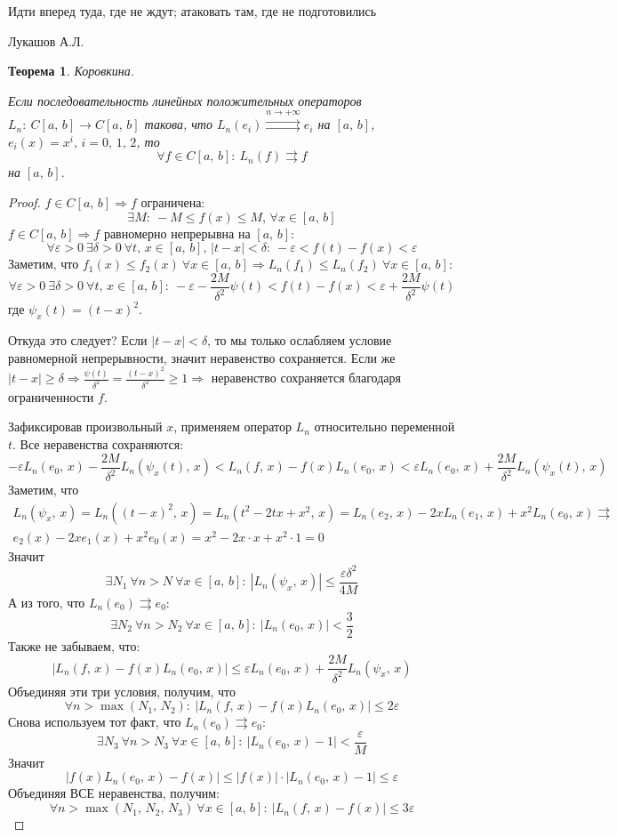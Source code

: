 \documentclass[a4paper,12pt]{article}
\renewcommand{\leq}{\ensuremath{\leqslant}}
\renewcommand{\geq}{\ensuremath{\geqslant}}
\theoremstyle{plain}
\newtheorem{theorem}{Теорема}[section]
\theoremstyle{definition}
\theoremstyle{remark}
\begin{document}
\epigraph{Идти вперед туда, где не ждут; атаковать там, где не подготовились}{Лукашов А.Л.}

\begin{theorem}
	Коровкина.

	Если последовательность линейных положительных операторов $L_n:\: C[a,\,b] \to C[a,\,b]$ такова, что $L_n(e_i) \stackrel{n \to +\infty}{\rightrightarrows} e_i$ на $[a,\,b]$, $e_i(x) = x^i,\, i = 0,\,1,\,2$, то 
	\[\forall f \in C[a,\,b]:\: L_n(f) \rightrightarrows f\]
	на $[a,\,b]$.
\end{theorem}
\begin{proof}
	$f \in C[a,\,b] \Rightarrow f$ ограничена:
	\[\exists M:\: -M \leq f(x) \leq M,\, \forall x \in [a,\,b]\]
	$f \in C[a,\,b] \Rightarrow f$ равномерно непрерывна на $[a,\,b]$: 
	\[\forall \varepsilon > 0 \: \exists \delta > 0 \: \forall t,\, x \in [a,\,b],\, |t - x| < \delta:\: -\varepsilon < f(t) - f(x) < \varepsilon\]
	Заметим, что $f_1(x) \leq f_2(x) \: \forall x \in [a,\,b] \Rightarrow L_n(f_1) \leq L_n(f_2) \: \forall x \in [a,\,b]$:
	\[\forall \varepsilon > 0 \: \exists \delta > 0 \: \forall t,\,x \in [a,\,b]:\: -\varepsilon - \frac{2M}{\delta^2}\psi(t) < f(t) - f(x) < \varepsilon + \frac{2M}{\delta^2}\psi(t)\]
	где $\psi_x(t) = (t - x)^2$.

	Откуда это следует? Если $|t - x| < \delta$, то мы только ослабляем условие равномерной непрерывности, значит неравенство сохраняется. Если же $|t - x| \geq \delta \Rightarrow \frac{\psi(t)}{\delta^2} = \frac{(t - x)^2}{\delta^2} \geq 1 \Rightarrow$ неравенство сохраняется благодаря ограниченности $f$.

	Зафиксировав произвольный $x$, применяем оператор $L_n$ относительно переменной $t$. Все неравенства сохраняются:
	\[-\varepsilon L_n(e_0,\, x) - \frac{2M}{\delta^2}L_n(\psi_x(t),\,x) < L_n(f,\,x) - f(x)L_n(e_0,\,x) < \varepsilon L_n(e_0,\, x) + \frac{2M}{\delta^2}L_n(\psi_x(t),\,x)\]
	Заметим, что 
	\begin{align*}
		L_n(\psi_x,\,x) = L_n((t - x)^2,\,x) = L_n(t^2 - 2tx + x^2,\,x) = L_n(e_2,\,x) - 2xL_n(e_1,\,x) + x^2L_n(e_0,\,x) \rightrightarrows\\
		e_2(x) - 2xe_1(x) + x^2e_0(x) = x^2 - 2x\cdot x + x^2\cdot 1 = 0
	\end{align*}
	Значит 
	\[\exists N_1 \: \forall n > N \: \forall x \in [a,\,b]:\: |L_n(\psi_x,\,x)| \leq \frac{\varepsilon\delta^2}{4M}\]
	А из того, что $L_n(e_0) \rightrightarrows e_0$:
	\[\exists N_2 \: \forall n > N_2 \: \forall x \in [a,\,b] :\: |L_n(e_0,\,x)| < \frac{3}{2}\]
	Также не забываем, что:
	\[|L_n(f,\,x) - f(x)L_n(e_0,\,x)| \leq \varepsilon L_n(e_0,\,x) + \frac{2M}{\delta^2}L_n(\psi_x,\,x)\]
	Объединяя эти три условия, получим, что
	\[\forall n > \max(N_1,\,N_2):\: |L_n(f,\,x) - f(x)L_n(e_0,\,x)| \leq 2\varepsilon\]
	Снова используем тот факт, что $L_n(e_0) \rightrightarrows e_0$:
	\[\exists N_3 \: \forall n > N_3 \: \forall x \in [a,\,b]:\: |L_n(e_0,\,x) - 1| < \frac{\varepsilon}{M}\]
	Значит
	\[|f(x)L_n(e_0,\,x) - f(x)| \leq |f(x)|\cdot|L_n(e_0,\,x) - 1| \leq \varepsilon\]
	Объединяя ВСЕ неравенства, получим:
	\[\forall n > \max(N_1,\,N_2,\,N_3) \: \forall x \in [a,\,b]:\: |L_n(f,\,x) - f(x)|\leq 3\varepsilon\]
\end{proof}
\end{document}
